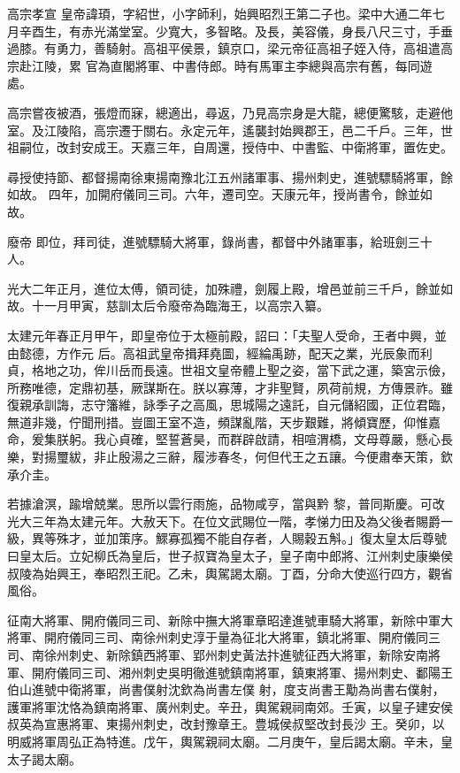 
\begin{pinyinscope}

 高宗孝宣
 皇帝諱頊，字紹世，小字師利，始興昭烈王第二子也。梁中大通二年七月辛酉生，有赤光滿堂室。少寬大，多智略。及長，美容儀，身長八尺三寸，手垂過膝。有勇力，善騎射。高祖平侯景，鎮京口，梁元帝征高祖子姪入侍，高祖遣高宗赴江陵，累
 官為直閣將軍、中書侍郎。時有馬軍主李總與高宗有舊，每同遊處。



 高宗嘗夜被酒，張燈而寐，總適出，尋返，乃見高宗身是大龍，總便驚駭，走避他室。及江陵陷，高宗遷于關右。永定元年，遙襲封始興郡王，邑二千戶。三年，世祖嗣位，改封安成王。天嘉三年，自周還，授侍中、中書監、中衛將軍，置佐史。



 尋授使持節、都督揚南徐東揚南豫北江五州諸軍事、揚州刺史，進號驃騎將軍，餘如故。
 四年，加開府儀同三司。六年，遷司空。天康元年，授尚書令，餘並如故。



 廢帝
 即位，拜司徒，進號驃騎大將軍，錄尚書，都督中外諸軍事，給班劍三十人。



 光大二年正月，進位太傅，領司徒，加殊禮，劍履上殿，增邑並前三千戶，餘並如故。十一月甲寅，慈訓太后令廢帝為臨海王，以高宗入纂。



 太建元年春正月甲午，即皇帝位于太極前殿，詔曰：「夫聖人受命，王者中興，並由懿德，方作元
 后。高祖武皇帝揖拜堯圖，經綸禹跡，配天之業，光辰象而利貞，格地之功，侔川岳而長遠。世祖文皇帝體上聖之姿，當下武之運，築宮示儉，所務唯德，定鼎初基，厥謀斯在。朕以寡薄，才非聖賢，夙荷前規，方傳景祚。雖復親承訓誨，志守籓維，詠季子之高風，思城陽之遠託，自元儲紹國，正位君臨，無道非幾，佇聞刑措。豈圖王室不造，頻謀亂階，天步艱難，將傾寶歷，仰惟嘉命，爰集朕躬。我心貞確，堅誓蒼昊，而群辟啟請，相喧渭橋，文母尊嚴，懸心長樂，對揚璽紱，非止殷湯之三辭，履涉春冬，何但代王之五讓。今便肅奉天策，欽承介圭。



 若據滄溟，踰增兢業。思所以雲行雨施，品物咸亨，當與黔
 黎，普同斯慶。可改光大三年為太建元年。大赦天下。在位文武賜位一階，孝悌力田及為父後者賜爵一級，異等殊才，並加策序。鰥寡孤獨不能自存者，人賜穀五斛。」復太皇太后尊號曰皇太后。立妃柳氏為皇后，世子叔寶為皇太子，皇子南中郎將、江州刺史康樂侯叔陵為始興王，奉昭烈王祀。乙未，輿駕謁太廟。丁酉，分命大使巡行四方，觀省風俗。



 征南大將軍、開府儀同三司、新除中撫大將軍章昭達進號車騎大將軍，新除中軍大將軍、開府儀同三司、南徐州刺史淳于量為征北大將軍，鎮北將軍、開府儀同三司、南徐州刺史、新除鎮西將軍、郢州刺史黃法抃進號征西大將軍，新除安南將軍、開府儀同三司、湘州刺史吳明徹進號鎮南將軍，鎮東將軍、揚州刺史、鄱陽王伯山進號中衛將軍，尚書僕射沈欽為尚書左僕
 射，度支尚書王勱為尚書右僕射，護軍將軍沈恪為鎮南將軍、廣州刺史。辛丑，輿駕親祠南郊。壬寅，以皇子建安侯叔英為宣惠將軍、東揚州刺史，改封豫章王。豊城侯叔堅改封長沙
 王。癸卯，以明威將軍周弘正為特進。戊午，輿駕親祠太廟。二月庚午，皇后謁太廟。辛未，皇太子謁太廟。




\end{pinyinscope}
